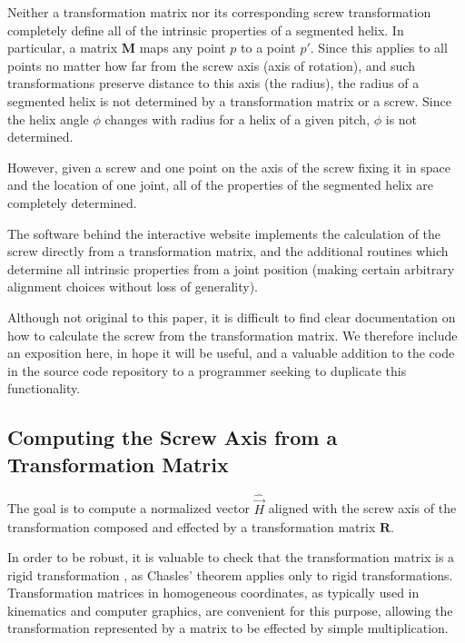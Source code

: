 \documentclass[mathematics,article,submit,pdftex,moreauthors]{Definitions/mdpi}
\begin{document}
Neither a transformation matrix nor its corresponding screw transformation
completely define all of the intrinsic
properties of a segmented helix. In particular, a matrix $\bm{M}$ maps any point $p$ to a point $p'$.
Since this applies to all points no matter how far from the screw axis (axis of rotation), and
such transformations preserve distance to this axis (the radius), the radius of a segmented helix
is not determined by a transformation matrix or a screw. Since the helix angle $\phi$ changes
with radius for a helix of a given pitch, $\phi$ is not determined.

However, given a screw and one point on the axis of the screw fixing it in space
and the location of one joint, all of the properties of the segmented helix are completely determined.

The software behind the interactive website implements the calculation of the screw
directly from a transformation matrix, and
the additional routines which determine all intrinsic properties from a joint position (making
certain arbitrary alignment choices without loss of generality).

Although not original to this paper, it is
difficult to find clear documentation on how to calculate the
screw from the transformation matrix.
We therefore include an exposition here, in hope it will be useful,
and a valuable addition to the code in the source code repository to a programmer seeking to duplicate
this functionality.

\subsection{Computing the Screw Axis from a Transformation Matrix}

The goal is to compute a normalized vector $\hat{\overrightarrow{H}}$ aligned with the screw
axis of the transformation composed and effected by a transformation matrix $\bm{R}$.

In order to be robust, it is valuable to check that the transformation
matrix is a rigid transformation \cite{wiki:rigid},
as Chasles' theorem applies only to rigid transformations.
Transformation matrices in homogeneous coordinates, as typically used in kinematics
and computer graphics, are convenient for this purpose, allowing the transformation
represented by a matrix to be effected by simple multiplication.
\end{document}
